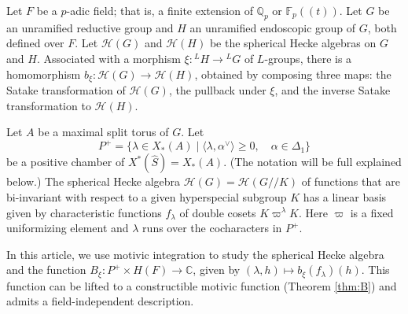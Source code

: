 
% 
% 


\newcommand{\XX}[1]{{\it  [To do: #1]}}
\newcommand{\ring}[1]{\mathbb{#1}}
\newcommand{\ang}[1]{\langle{#1}\rangle}
\def\op#1{{\operatorname{#1}}}
\def\inv{\op{inv}}
\def\dom{P^+}
\def\Q{{\ring{Q}}}
\def\card{\op{card}}
\def\CSrho{[W_S\backslash C_\rho]}

\def\C{\mathcal C}
\def\N{\mathcal N}
\def\H{\mathcal H}
\def\M{\mathcal M}
\def\T{\mathcal T}

\def\n{{\mathfrak n}}
\def\g{{\mathfrak g}}
\def\t{{\mathfrak t}}
\def\h{{\mathfrak h}}

\def\Frob{\op{Frob}}
\def\dotw{\dot w}
\def\uu{\upsilon} %

\def\libel#1{{\text{\sc [#1]~}}\label{#1}}
\def\rif#1{(\ref{#1}-{\text{\sc #1})}}




Let $F$ be a $p$-adic field; that is, a finite extension of
$\ring{Q}_p$ or $\ring{F}_p((t))$.  Let $G$ be an unramified reductive
group and $H$ an unramified endoscopic group of $G$, both defined over
$F$.  Let $\H(G)$ and $\H(H)$ be the spherical Hecke algebras on $G$
and $H$.  Associated with a morphism $\xi:{}^LH\to {}^LG$ of
$L$-groups, there is a homomorphism $b_\xi:\H(G)\to \H(H)$, obtained
by composing three maps: the Satake transformation of $\H(G)$, the
pullback under $\xi$, and the inverse Satake transformation to
$\H(H)$.

Let $A$ be a maximal split torus of $G$.  Let 
\[
\dom = \{\lambda\in X_*(A) \mid \ang{\lambda,\alpha^\vee}\ge 0,
\quad \alpha\in \Delta_1\}
\]
be a positive chamber of $X^*(\hat S) = X_*(A)$.  (The notation
will be full explained below.)   The spherical
Hecke algebra $\H(G)=\H(G//K)$ of functions that are bi-invariant with
respect to a given hyperspecial subgroup $K$ has a linear basis given
by characteristic functions $f_\lambda$ of double cosets
$K\varpi^\lambda K$.  Here $\varpi$ is a fixed uniformizing element
and $\lambda$ runs over the cocharacters in
$P^+$.

In this article, we use motivic integration to study the spherical
Hecke algebra and the function $B_\xi:P^+\times
H(F)\to \ring{C}$, given by $(\lambda,h)\mapsto b_\xi(f_\lambda)(h)$.
This function can be lifted to a constructible motivic function
(Theorem \ref{thm:B}) and admits a field-independent description.

